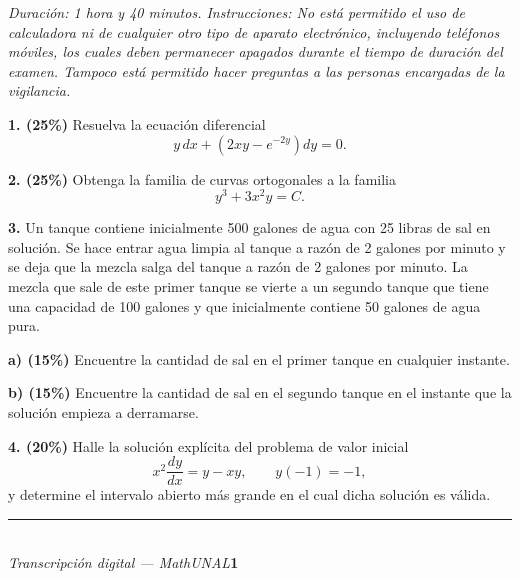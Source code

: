 \documentclass[11pt]{article}
\begin{document}
\examheader

\vspace{4pt}
\noindent\textit{Duración: 1 hora y 40 minutos. Instrucciones: No está permitido el uso de calculadora ni de cualquier otro tipo de aparato electrónico, incluyendo teléfonos móviles, los cuales deben permanecer apagados durante el tiempo de duración del examen. Tampoco está permitido hacer preguntas a las personas encargadas de la vigilancia.}

\vspace{6pt}
\noindent\textbf{1. (25\%)} Resuelva la ecuación diferencial
\[
y\,dx+\left(2xy-e^{-2y}\right)dy=0.
\]

\vspace{6cm}

\newpage

\noindent\textbf{2. (25\%)} Obtenga la familia de curvas ortogonales a la familia
\[
y^3+3x^2y=C.
\]

\vspace{7cm}

\newpage

\noindent\textbf{3.} Un tanque contiene inicialmente 500 galones de agua con 25 libras de sal en solución. Se hace entrar agua limpia al tanque a razón de 2 galones por minuto y se deja que la mezcla salga del tanque a razón de 2 galones por minuto. La mezcla que sale de este primer tanque se vierte a un segundo tanque que tiene una capacidad de 100 galones y que inicialmente contiene 50 galones de agua pura.

\vspace{0.2cm}
\noindent\textbf{a) (15\%)} Encuentre la cantidad de sal en el primer tanque en cualquier instante.

\vspace{3.5cm}

\noindent\textbf{b) (15\%)} Encuentre la cantidad de sal en el segundo tanque en el instante que la solución empieza a derramarse.

\vspace{3.5cm}

\newpage

\noindent\textbf{4. (20\%)} Halle la solución explícita del problema de valor inicial
\[
x^2\frac{dy}{dx}=y-xy, \qquad y(-1)=-1,
\]
y determine el intervalo abierto más grande en el cual dicha solución es válida.

\vspace{7cm}

\vfill
\rule{\linewidth}{0.4pt}\\[1pt]
{\scriptsize\textit{Transcripción digital --- MathUNAL}\hfill\textcolor{unalblue}{\textbf{1}}}
\end{document}

